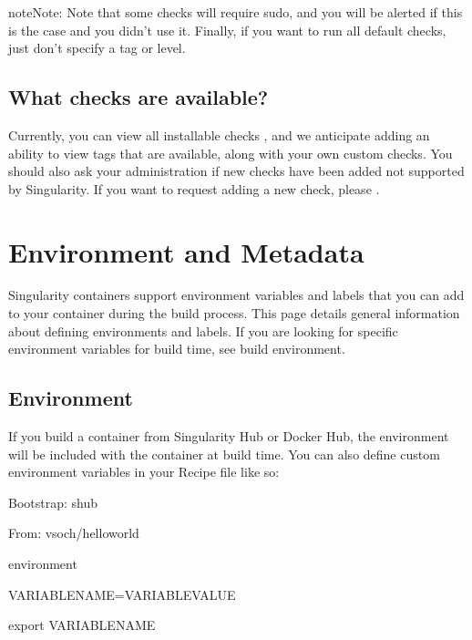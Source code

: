 \documentclass[letterpaper,10pt,english]{sphinxmanual}
\begin{document}
\begin{sphinxadmonition}{note}{Note:}
Note that some checks will require sudo, and you will be alerted if this
is the case and you didn’t use it. Finally, if you want to run all
default checks, just don’t specify a tag or level.
\end{sphinxadmonition}


\section{What checks are available?}
\label{\detokenize{container_checks:what-checks-are-available}}
Currently, you can view all installable checks
,
and we anticipate adding an ability to view tags that are available,
along with your own custom checks. You should also ask your
administration if new checks have been added not supported by
Singularity. If you want to request adding a new check, please .


\chapter{Environment and Metadata}
\label{\detokenize{environment_and_metadata:environment-and-metadata}}\label{\detokenize{environment_and_metadata:id1}}\label{\detokenize{environment_and_metadata::doc}}\label{\detokenize{environment_and_metadata:sec-envandmetadata}}
Singularity containers support environment variables and labels that you
can add to your container during the build process. This page details
general information about defining environments and labels. If you are
looking for specific environment variables for build time, see build
environment.


\section{Environment}
\label{\detokenize{environment_and_metadata:environment}}
If you build a container from Singularity Hub or Docker Hub, the
environment will be included with the container at build time. You can
also define custom environment variables in your Recipe file like so:

%
\begin{sphinxVerbatim}[commandchars=\\\{\}]
Bootstrap: shub

From: vsoch/hello\PYGZhy{}world


\PYGZpc{}environment

    VARIABLE\PYGZus{}NAME=VARIABLE\PYGZus{}VALUE

    export VARIABLE\PYGZus{}NAME
\end{sphinxVerbatim}
\end{document}
